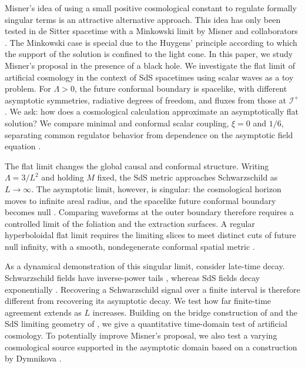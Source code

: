 \documentclass[
 aps,
 prd,
 reprint,
 superscriptaddress,
 nofootinbib,
 longbibliography
]{revtex4-2}
\newcommand{\scri}{\mathscr{I}}
\begin{document}
Misner's idea of using a small positive cosmological constant to regulate formally singular terms is an attractive alternative approach. This idea has only been tested in de Sitter spacetime with a Minkowski limit by Misner and collaborators \cite{misner_hyperboloidal_2006,misner_over_2006,misner_excising_2006}. The Minkowski case is special due to the Huygens' principle according to which the support of the solution is confined to the light cone. In this paper, we study Misner's proposal in the presence of a black hole. We investigate the flat limit of artificial cosmology in the context of SdS spacetimes using scalar waves as a toy problem. For $\Lambda>0$, the future conformal boundary is spacelike, with different asymptotic symmetries, radiative degrees of freedom, and fluxes from those at $\scri^+$ \cite{Ashtekar:2014zfa,Ashtekar:2015lla,Ashtekar:2015lxa}.  We ask: how does a cosmological calculation approximate an asymptotically flat solution?  We compare minimal and conformal scalar coupling, $\xi=0$ and $1/6$, separating common regulator behavior from dependence on the asymptotic field equation \cite{brady_radiative_1999}.

The flat limit changes the global causal and conformal
structure.  Writing $\Lambda=3/L^2$ and holding $M$ fixed, the SdS metric approaches Schwarzschild as $L\to\infty$. The asymptotic limit, however, is singular: the cosmological horizon moves to infinite areal radius, and the spacelike future conformal boundary becomes null \cite{Geroch:1969limits, Ashtekar:2014zfa,BugdenPaganini:2019,ZhouPanossoMacedo:2025}.
Comparing waveforms at the outer boundary therefore requires a controlled
limit of the foliation and the extraction surfaces.  A regular hyperboloidal
flat limit requires the limiting slices to meet distinct cuts of future
null infinity, with a smooth, nondegenerate conformal spatial metric
\cite{zenginoglu_bridge_2025,ZhouPanossoMacedo:2025}.

As a dynamical demonstration of this singular limit, consider late-time decay. Schwarzschild fields have inverse-power tails \cite{price1972nonspherical}, whereas SdS fields decay exponentially \cite{Brady:1996za,brady_radiative_1999,Molina:2003dc}. Recovering a Schwarzschild signal over a finite interval is therefore different from recovering its asymptotic decay.  We test how far finite-time agreement extends as $L$ increases.
Building on the bridge construction of \cite{zenginoglu_bridge_2025} and the SdS limiting geometry of
\cite{ZhouPanossoMacedo:2025}, we give a quantitative time-domain test of artificial cosmology. To potentially improve Misner's proposal, we also test a varying cosmological source supported in the asymptotic domain based on a construction by Dymnikova \cite{Dymnikova:2000algebraic,Dymnikova:2002mass}. 
\end{document}
